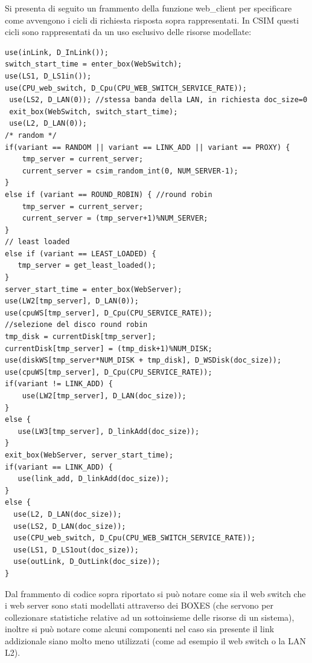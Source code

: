 Si presenta di seguito un frammento della funzione web\_client per specificare come avvengono i cicli di richiesta risposta sopra rappresentati. In CSIM questi cicli sono rappresentati da un uso esclusivo delle risorse modellate: 
\begin{lstlisting}
use(inLink, D_InLink()); 
switch_start_time = enter_box(WebSwitch); 
use(LS1, D_LS1in()); 
use(CPU_web_switch, D_Cpu(CPU_WEB_SWITCH_SERVICE_RATE)); 
 use(LS2, D_LAN(0)); //stessa banda della LAN, in richiesta doc_size=0 
 exit_box(WebSwitch, switch_start_time); 
 use(L2, D_LAN(0)); 
/* random */ 
if(variant == RANDOM || variant == LINK_ADD || variant == PROXY) { 
    tmp_server = current_server; 
    current_server = csim_random_int(0, NUM_SERVER-1); 
} 
else if (variant == ROUND_ROBIN) { //round robin 
    tmp_server = current_server; 
    current_server = (tmp_server+1)%NUM_SERVER; 
} 
// least loaded 
else if (variant == LEAST_LOADED) { 
   tmp_server = get_least_loaded(); 
} 
server_start_time = enter_box(WebServer); 
use(LW2[tmp_server], D_LAN(0)); 
use(cpuWS[tmp_server], D_Cpu(CPU_SERVICE_RATE)); 
//selezione del disco round robin 
tmp_disk = currentDisk[tmp_server]; 
currentDisk[tmp_server] = (tmp_disk+1)%NUM_DISK; 
use(diskWS[tmp_server*NUM_DISK + tmp_disk], D_WSDisk(doc_size)); 
use(cpuWS[tmp_server], D_Cpu(CPU_SERVICE_RATE)); 
if(variant != LINK_ADD) { 
    use(LW2[tmp_server], D_LAN(doc_size)); 
} 
else { 
   use(LW3[tmp_server], D_linkAdd(doc_size)); 
}		 
exit_box(WebServer, server_start_time); 
if(variant == LINK_ADD) { 
   use(link_add, D_linkAdd(doc_size)); 
}		  
else { 
  use(L2, D_LAN(doc_size)); 
  use(LS2, D_LAN(doc_size)); 
  use(CPU_web_switch, D_Cpu(CPU_WEB_SWITCH_SERVICE_RATE)); 
  use(LS1, D_LS1out(doc_size)); 
  use(outLink, D_OutLink(doc_size)); 
}	
\end{lstlisting}
Dal frammento di codice sopra riportato si può notare come sia il web switch che i web server sono stati modellati attraverso dei BOXES (che servono per collezionare statistiche relative ad un sottoinsieme delle risorse di un sistema), inoltre si può notare come alcuni componenti nel caso sia presente il link addizionale siano molto meno utilizzati (come ad esempio il web switch o la LAN L2).

